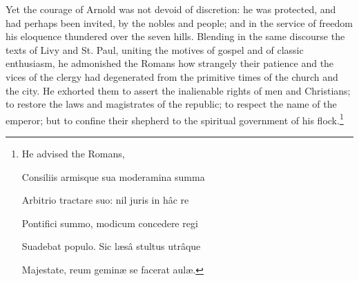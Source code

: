 Yet the courage of Arnold was not devoid of discretion: he was protected, and had perhaps been invited, by the nobles and people; and in the service of freedom his eloquence thundered over the seven hills. Blending in the same discourse the texts of Livy and St. Paul, uniting the motives of gospel and of classic enthusiasm, he admonished the Romans how strangely their patience and the vices of the clergy had degenerated from the primitive times of the church and the city. He exhorted them to assert the inalienable rights of men and Christians; to restore the laws and magistrates of the republic; to respect the name of the emperor; but to confine their shepherd to the spiritual government of his flock.\footnote{He advised the Romans,

Consiliis armisque sua moderamina summa

Arbitrio tractare suo: nil juris in hâc re

Pontifici summo, modicum concedere regi

Suadebat populo. Sic læsâ stultus utrâque

Majestate, reum geminæ se facerat aulæ.

}
